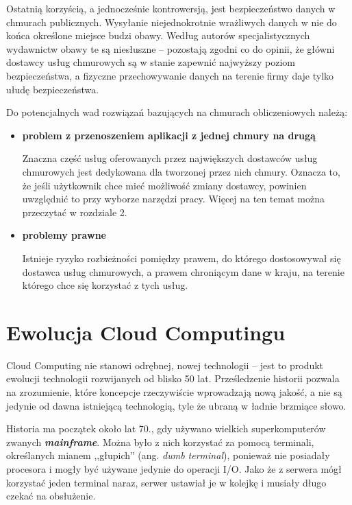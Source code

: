 \documentclass[12pt,a4paper,twoside,titlepage,openright]{book}
\begin{document}
Ostatnią korzyścią, a jednocześnie kontrowersją, jest bezpieczeństwo danych w chmurach publicznych. Wysyłanie niejednokrotnie wrażliwych danych w nie do końca określone miejsce budzi obawy. Według autorów specjalistycznych wydawnictw\cite{ccCambridge,ccBiznes} obawy te są niesłuszne -- pozostają zgodni co do opinii, że główni dostawcy usług chmurowych są w stanie zapewnić najwyższy poziom bezpieczeństwa, a fizyczne przechowywanie danych na terenie firmy daje tylko ułudę bezpieczeństwa.

Do potencjalnych wad rozwiązań bazujących na chmurach obliczeniowych należą:

\begin{itemize}

\item \textbf{problem z przenoszeniem aplikacji z jednej chmury na drugą}

Znaczna część usług oferowanych przez największych dostawców usług chmurowych jest dedykowana dla tworzonej przez nich chmury. Oznacza to, że jeśli użytkownik chce mieć możliwość zmiany dostawcy, powinien uwzględnić to przy wyborze narzędzi pracy. Więcej na ten temat można przeczytać w rozdziale 2.

\item \textbf{problemy prawne}

Istnieje ryzyko rozbieżności pomiędzy prawem, do którego dostosowywał się dostawca usług chmurowych, a prawem chroniącym dane w kraju, na terenie którego chce się korzystać z tych usług. 

\end{itemize}


\section{Ewolucja Cloud Computingu}

Cloud Computing nie stanowi odrębnej, nowej technologii -- jest to produkt ewolucji technologii rozwijanych od blisko 50 lat. Prześledzenie historii pozwala na zrozumienie, które koncepcje rzeczywiście wprowadzają nową jakość, a nie są jedynie od dawna istniejącą technologią, tyle że  ubraną w ładnie brzmiące słowo.


Historia ma początek około lat 70., gdy używano wielkich superkomputerów zwanych \textbf{\textit{mainframe}}. Można było z nich korzystać za pomocą terminali, określanych mianem ,,głupich'' (ang. \textit{dumb terminal}), ponieważ nie posiadały procesora i mogły być używane jedynie do operacji I/O. Jako że z serwera mógł korzystać jeden terminal naraz, serwer ustawiał je w kolejkę i musiały długo czekać na obsłużenie.
\end{document}
